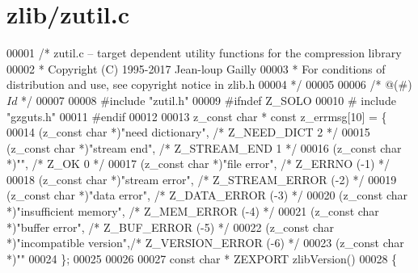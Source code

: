 \hypertarget{zlib_2zutil_8c_source}{}\section{zlib/zutil.c}
\label{zlib_2zutil_8c_source}

\begin{DoxyCode}
00001 \textcolor{comment}{/* zutil.c -- target dependent utility functions for the compression library}
00002 \textcolor{comment}{ * Copyright (C) 1995-2017 Jean-loup Gailly}
00003 \textcolor{comment}{ * For conditions of distribution and use, see copyright notice in zlib.h}
00004 \textcolor{comment}{ */}
00005 
00006 \textcolor{comment}{/* @(#) $Id$ */}
00007 
00008 \textcolor{preprocessor}{#include "zutil.h"}
00009 \textcolor{preprocessor}{#ifndef Z\_SOLO}
00010 \textcolor{preprocessor}{#  include "gzguts.h"}
00011 \textcolor{preprocessor}{#endif}
00012 
00013 z\_const \textcolor{keywordtype}{char} * \textcolor{keyword}{const} z\_errmsg[10] = \{
00014     (z\_const \textcolor{keywordtype}{char} *)\textcolor{stringliteral}{"need dictionary"},     \textcolor{comment}{/* Z\_NEED\_DICT       2  */}
00015     (z\_const \textcolor{keywordtype}{char} *)\textcolor{stringliteral}{"stream end"},          \textcolor{comment}{/* Z\_STREAM\_END      1  */}
00016     (z\_const \textcolor{keywordtype}{char} *)\textcolor{stringliteral}{""},                    \textcolor{comment}{/* Z\_OK              0  */}
00017     (z\_const \textcolor{keywordtype}{char} *)\textcolor{stringliteral}{"file error"},          \textcolor{comment}{/* Z\_ERRNO         (-1) */}
00018     (z\_const \textcolor{keywordtype}{char} *)\textcolor{stringliteral}{"stream error"},        \textcolor{comment}{/* Z\_STREAM\_ERROR  (-2) */}
00019     (z\_const \textcolor{keywordtype}{char} *)\textcolor{stringliteral}{"data error"},          \textcolor{comment}{/* Z\_DATA\_ERROR    (-3) */}
00020     (z\_const \textcolor{keywordtype}{char} *)\textcolor{stringliteral}{"insufficient memory"}, \textcolor{comment}{/* Z\_MEM\_ERROR     (-4) */}
00021     (z\_const \textcolor{keywordtype}{char} *)\textcolor{stringliteral}{"buffer error"},        \textcolor{comment}{/* Z\_BUF\_ERROR     (-5) */}
00022     (z\_const \textcolor{keywordtype}{char} *)\textcolor{stringliteral}{"incompatible version"},\textcolor{comment}{/* Z\_VERSION\_ERROR (-6) */}
00023     (z\_const \textcolor{keywordtype}{char} *)\textcolor{stringliteral}{""}
00024 \};
00025 
00026 
00027 \textcolor{keyword}{const} \textcolor{keywordtype}{char} * ZEXPORT zlibVersion()
00028 \{

\end{DoxyCode}

